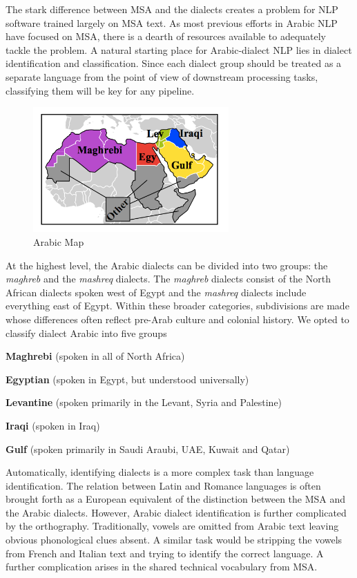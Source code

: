 \documentclass[10pt, a4paper]{article}
\begin{document}
The stark difference between MSA and the dialects creates a problem
for NLP software trained largely on MSA text. As most previous efforts
in Arabic NLP have focused on MSA, there is a dearth of resources
available to adequately tackle the problem. A natural starting place
for Arabic-dialect NLP lies in dialect identification and
classification. Since each dialect group should be treated as a
separate language from the point of view of downstream processing tasks,
classifying them will be key for any pipeline.
\begin{figure}
\centering
  \includegraphics[width=75mm]{figs/dialect_map2.png}	
\caption{Arabic Map}
\end{figure} 
At the highest level, the Arabic dialects can be divided into two
groups: the \textit{maghreb} and the \textit{mashreq} dialects. The
\textit{maghreb} dialects consist of the North African dialects spoken west of
Egypt and the \textit{mashreq} dialects include everything east of
Egypt. Within these broader categories, subdivisions are made whose
differences often reflect pre-Arab culture and colonial history. We
opted to classify dialect Arabic into five groups
	\begin{description}
		\item \textbf{Maghrebi} (spoken in all of North
Africa)
		\item \textbf{Egyptian} (spoken in Egypt, but
understood universally)
		\item \textbf{Levantine} (spoken primarily in the
Levant, Syria and Palestine)
		\item \textbf{Iraqi} (spoken in Iraq)
		\item \textbf{Gulf} (spoken primarily in Saudi Araubi,
UAE, Kuwait and Qatar)
	\end{description}
	
Automatically, identifying dialects is a more complex task than
language identification. The relation between Latin and Romance
languages is often brought forth as a European equivalent of the
distinction between the MSA and the Arabic dialects. However, Arabic
dialect identification is further complicated by the
orthography. Traditionally, vowels are omitted from Arabic text
leaving obvious phonological clues absent. A similar task would be
stripping the vowels from French and Italian text and trying to
identify the correct language. A further complication arises in the
shared technical vocabulary from MSA.
\end{document}
